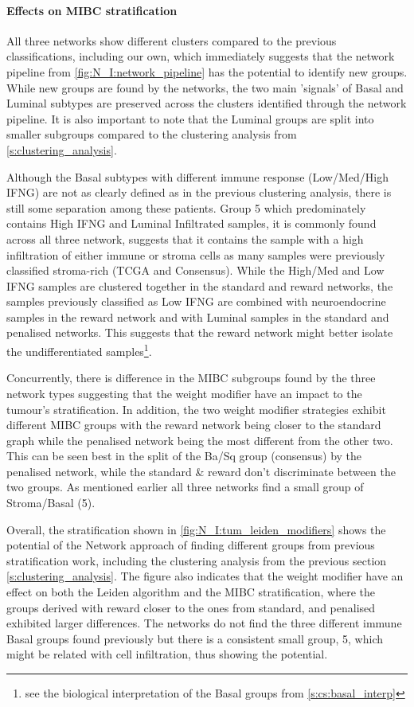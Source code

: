 \paragraph*{Effects on MIBC stratification}


All three networks show different clusters compared to the previous classifications, including our own, which immediately suggests that the network pipeline from \cref{fig:N_I:network_pipeline} has the potential to identify new groups. While new groups are found by the networks, the two main 'signals' of Basal and Luminal subtypes are preserved across the clusters identified through the network pipeline. It is also important to note that the Luminal groups are split into smaller subgroups compared to the clustering analysis from \cref{s:clustering_analysis}. 

Although the Basal subtypes with different immune response (Low/Med/High IFNG) are not as clearly defined as in the previous clustering analysis, there is still some separation among these patients. Group 5 which predominately contains High IFNG and Luminal Infiltrated samples, it is commonly found across all three network, suggests that it contains the sample with a high infiltration of either immune or stroma cells as many samples were previously classified stroma-rich (TCGA and Consensus). While the High/Med and Low IFNG samples are clustered together in the standard and reward networks, the samples previously classified as Low IFNG are combined with neuroendocrine samples in the reward network and with Luminal samples in the standard and penalised networks. This suggests that the reward network might better isolate the undifferentiated samples\footnote{see the biological interpretation of the Basal groups from \cref{s:cs:basal_interp}}.

Concurrently, there is difference in the MIBC subgroups found by the three network types suggesting that the weight modifier have an impact to the tumour's stratification. In addition, the two weight modifier strategies exhibit different MIBC groups with the reward network being closer to the standard graph while the penalised network being the most different from the other two. This can be seen best in the split of the Ba/Sq group (consensus) by the penalised network, while the standard \& reward don't discriminate between the two groups. As mentioned earlier all three networks find a small group of Stroma/Basal (5).

Overall, the stratification shown in \cref{fig:N_I:tum_leiden_modifiers} shows the potential of the Network approach of finding different groups from previous stratification work, including the clustering analysis from the previous section \cref{s:clustering_analysis}. The figure also indicates that the weight modifier have an effect on both the Leiden algorithm and the MIBC stratification, where the groups derived with reward closer to the ones from standard, and penalised exhibited larger differences. The networks do not find the three different immune Basal groups found previously but there is a consistent small group, 5, which might be related with cell infiltration, thus showing the potential.



